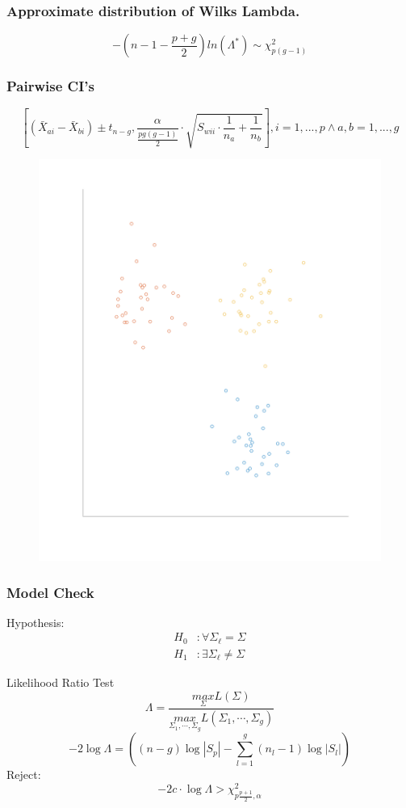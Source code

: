 \documentclass[aspectratio=169,10pt,t]{beamer}
\begin{document}
\begin{frame}[t]
    \frametitle{Approximate distribution of Wilks Lambda.}
    \[
        -\left(n-1-\frac{p+g}{2}\right)ln\left( \Lambda^*\right) \sim \chi^2_{p(g-1)}
    \]  
\end{frame}

\begin{frame}[t]
    \frametitle{Pairwise CI's}
    \[
        \left[(\bar{X}_{ai} - \bar{X}_{bi}) \pm t_{n-g}, \frac{\alpha}{ \frac{pg(g-1)}{2}} \cdot \sqrt{S_{wii} \cdot \frac{1}{n_a} + \frac{1}{n_b} } \right] , i = 1,...,p \land a,b = 1,...,g
    \] 
\begin{figure}[H]
    \includegraphics[scale=0.2]{clusters.png}
\end{figure}
\end{frame}


\begin{frame}[t]
	\frametitle{Model Check}
    Hypothesis:
	\[
		\begin{aligned}
			H_0 &: \forall \Sigma_\ell = \Sigma\\
			H_1 &: \exists \Sigma_\ell \neq \Sigma
		\end{aligned}
	\] 
    
    Likelihood Ratio Test
\[
\Lambda = \frac{\underset{\Sigma}{max}L(\Sigma)}{\underset{\Sigma_1,\cdots,\Sigma_g}{max}L(\Sigma_1,\cdots,\Sigma_g)} 
\] 
    \[
        -2\log\Lambda =  \left((n-g)\log|S_p| - \sum^{g}_{l=1}(n_l - 1) \log|S_l| \right) 
    \]
    Reject:
    \[
        -2c \cdot \log\Lambda > \chi^2_{p \frac{p+1}{2}, \alpha}
    \] 

\end{frame}
\end{document}
